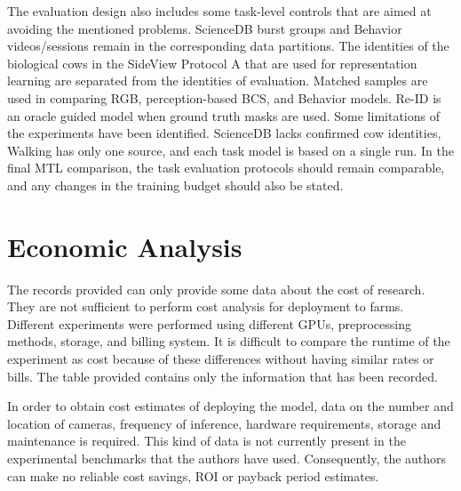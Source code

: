 

The evaluation design also includes some task-level controls that are aimed at avoiding the mentioned problems. ScienceDB burst groups and Behavior videos/sessions remain in the corresponding data partitions. The identities of the biological cows in the SideView Protocol A that are used for representation learning are separated from the identities of evaluation. Matched samples are used in comparing RGB, perception-based BCS, and Behavior models. Re-ID is an oracle guided model when ground truth masks are used. Some limitations of the experiments have been identified. ScienceDB lacks confirmed cow identities, Walking has only one source, and each task model is based on a single run. In the final MTL comparison, the task evaluation protocols should remain comparable, and any changes in the training budget should also be stated.

\section{Economic Analysis}

The records provided can only provide some data about the cost of research. They are not sufficient to perform cost analysis for deployment to farms. Different experiments were performed using different GPUs, preprocessing methods, storage, and billing system. It is difficult to compare the runtime of the experiment as cost because of these differences without having similar rates or bills. The table provided contains only the information that has been recorded.



In order to obtain cost estimates of deploying the model, data on the number and location of cameras, frequency of inference, hardware requirements, storage and maintenance is required. This kind of data is not currently present in the experimental benchmarks that the authors have used. Consequently, the authors can make no reliable cost savings, ROI or payback period estimates.
